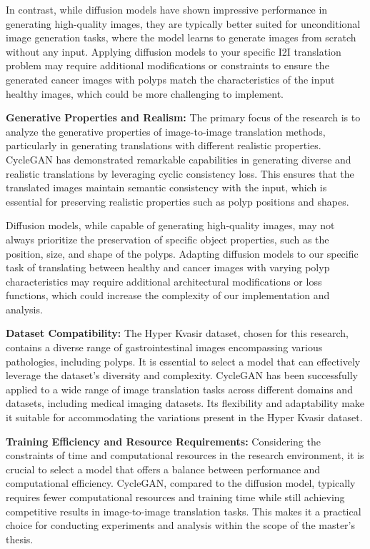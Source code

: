 \documentclass[UKenglish,12pt]{master-style}
\begin{document}
In contrast, while diffusion models have shown impressive performance in generating high-quality images, they are typically better suited for unconditional image generation tasks, where the model learns to generate images from scratch without any input. Applying diffusion models to your specific I2I translation problem may require additional modifications or constraints to ensure the generated cancer images with polyps match the characteristics of the input healthy images, which could be more challenging to implement.

\textbf{Generative Properties and Realism:}
The primary focus of the research is to analyze the generative properties of image-to-image translation methods, particularly in generating translations with different realistic properties.
CycleGAN has demonstrated remarkable capabilities in generating diverse and realistic translations by leveraging cyclic consistency loss. This ensures that the translated images maintain semantic consistency with the input, which is essential for preserving realistic properties such as polyp positions and shapes.

Diffusion models, while capable of generating high-quality images, may not always prioritize the preservation of specific object properties, such as the position, size, and shape of the polyps. Adapting diffusion models to our specific task of translating between healthy and cancer images with varying polyp characteristics may require additional architectural modifications or loss functions, which could increase the complexity of our implementation and analysis.

\textbf{Dataset Compatibility:}
The Hyper Kvasir dataset, chosen for this research, contains a diverse range of gastrointestinal images encompassing various pathologies, including polyps. It is essential to select a model that can effectively leverage the dataset's diversity and complexity.
CycleGAN has been successfully applied to a wide range of image translation tasks across different domains and datasets, including medical imaging datasets. Its flexibility and adaptability make it suitable for accommodating the variations present in the Hyper Kvasir dataset.

\textbf{Training Efficiency and Resource Requirements:}
Considering the constraints of time and computational resources in the research environment, it is crucial to select a model that offers a balance between performance and computational efficiency.
CycleGAN, compared to the diffusion model, typically requires fewer computational resources and training time while still achieving competitive results in image-to-image translation tasks. This makes it a practical choice for conducting experiments and analysis within the scope of the master's thesis.
\end{document}
